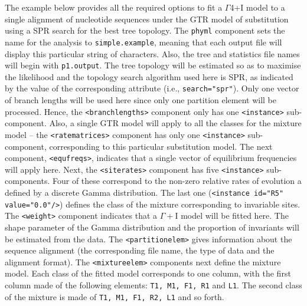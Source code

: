 \documentclass[a4paper,12pt]{article}
\newcommand{\x}[1]{\texttt{#1}}
\begin{document}
The example below provides all the required options to fit a $\Gamma$4+I model to a single alignment
of nucleotide  sequences under the GTR  model of substitution using  a SPR search for  the best tree
topology. The \x{phyml} component sets the name for the analysis to \x{simple.example}, meaning that
each output file  will display this particular  string of characters. Also, the  tree and statistics
file names will begin with \x{p1.output}. The tree  topology will be estimated so as to maximise the
likelihood and  the topology search  algorithm used here  is SPR, as indicated  by the value  of the
corresponding attribute  (i.e., \x{search="spr"}). Only  one vector of  branch lengths will  be used
here since  only one partition element  will be processed. Hence,  the \x{<branchlengths>} component
only has one  \x{<instance>} sub-component. Also, a single  GTR model will apply to  all the classes
for the mixture model -- the \x{<ratematrices>} component has only one \x{<instance>} sub-component,
corresponding to this  particular substitution model. The next  component, \x{<equfreqs>}, indicates
that a single vector of equilibrium frequencies will apply here. Next, the \x{<siterates>} component
has five \x{<instance>} sub-components.  Four of these  correspond to the non-zero relative rates of
evolution  a  defined  by  a  discrete  Gamma distribution.   The  last  one  (\x{<instance  id="R5"
value="0.0"/>})  defines  the  class  of  the   mixture  corresponding  to  invariable  sites.   The
\x{<weight>} component indicates that a $\Gamma+$I model will be fitted here. The shape parameter of
the  Gamma distribution  and the  proportion of  invariants will  be estimated  from the  data.  The
\x{<partitionelem>} gives information about the sequence alignment (the corresponding file name, the
type of  data and the  alignment format). The \x{<mixtureelem>}  components next define  the mixture
model. Each class of the  fitted model corresponds to one column, with the  first column made of the
following elements: \x{T1, M1, F1, R1} and \x{L1}. The second class of the mixture is made of \x{T1,
M1, F1, R2, L1} and so forth.
\end{document}
